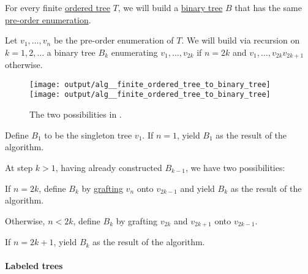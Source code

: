 \begin{algorithm}\label{alg:finite_ordered_tree_to_binary_tree}
  For every finite \hyperref[def:ordered_tree]{ordered tree} \( T \), we will build a \hyperref[def:n_ary_tree]{binary tree} \( B \) that has the same \hyperref[eq:def:ordered_tree_enumeration/pre]{pre-order enumeration}.

  Let \( v_1, \ldots, v_n \) be the pre-order enumeration of \( T \). We will build via recursion on \( k = 1, 2, \ldots \) a binary tree \( B_k \) enumerating \( v_1, \ldots, v_{2k} \) if \( n = 2k \) and \( v_1, \ldots, v_{2k} v_{2k+1} \) otherwise.

  \begin{figure}[!ht]
    \hfill
    \texttt{[image: output/alg\_\_finite\_ordered\_tree\_to\_binary\_tree]}
    \hfill
    \texttt{[image: output/alg\_\_finite\_ordered\_tree\_to\_binary\_tree]}
    \hfill
    \hfill
    \caption{The two possibilities in .}
    \label{fig:alg:finite_ordered_tree_to_binary_tree}
  \end{figure}

  \begin{thmenum}
     Define \( B_1 \) to be the singleton tree \( v_1 \). If \( n = 1 \), yield \( B_1 \) as the result of the algorithm.

     At step \( k > 1 \), having already constructed \( B_{k-1} \), we have two possibilities:
    \begin{thmenum}
       If \( n = 2k \), define \( B_k \) by \hyperref[def:ordered_tree_grafting]{grafting} \( v_n \) onto \( v_{2k-1} \) and yield \( B_k \) as the result of the algorithm.

       Otherwise, \( n < 2k \), define \( B_k \) by grafting \( v_{2k} \) and \( v_{2k+1} \) onto \( v_{2k-1} \).

      If \( n = 2k+1 \), yield \( B_k \) as the result of the algorithm.
    \end{thmenum}
  \end{thmenum}
\end{algorithm}

\paragraph{Labeled trees}

